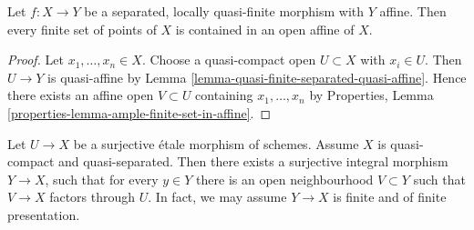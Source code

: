 \begin{lemma}
\label{lemma-separated-locally-quasi-finite-over-affine}
Let $f : X \to Y$ be a separated, locally quasi-finite morphism
with $Y$ affine. Then every finite set of points of $X$ is contained
in an open affine of $X$.
\end{lemma}

\begin{proof}
Let $x_1, \ldots, x_n \in X$. Choose a quasi-compact open
$U \subset X$ with $x_i \in U$. Then $U \to Y$ is quasi-affine by
Lemma \ref{lemma-quasi-finite-separated-quasi-affine}.
Hence there exists an affine open $V \subset U$ containing
$x_1, \ldots, x_n$ by
Properties, Lemma \ref{properties-lemma-ample-finite-set-in-affine}.
\end{proof}

\begin{lemma}
\label{lemma-there-is-a-scheme-integral-over}
Let $U \to X$ be a surjective \'etale morphism of schemes. Assume $X$
is quasi-compact and quasi-separated. Then there exists a surjective
integral morphism $Y \to X$, such that for
every $y \in Y$ there is an open neighbourhood $V \subset Y$
such that $V \to X$ factors through $U$. In fact, we may assume
$Y \to X$ is finite and of finite presentation.
\end{lemma}

